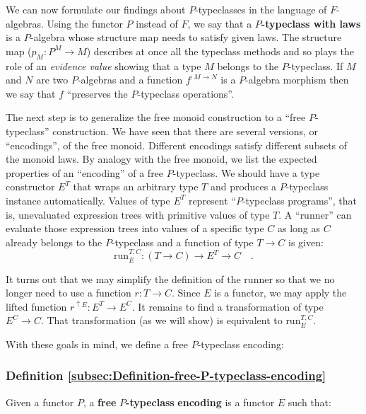 We can now formulate our findings about $P$-typeclasses in the language
of $F$-algebras. Using the functor $P$ instead of $F$, we say that
a $P$\textbf{-typeclass with laws} is
a $P$-algebra whose structure map needs to satisfy given laws. The
structure map ($p_{M}:P^{M}\rightarrow M$) describes at once all
the typeclass methods and so plays the role of an \emph{evidence value}
showing that a type $M$ belongs to the $P$-typeclass. If $M$ and
$N$ are two $P$-algebras and a function $f^{:M\rightarrow N}$ is
a $P$-algebra morphism then we say that $f$ \textsf{``}preserves the $P$-typeclass
operations\textsf{''}. 

The next step is to generalize the free monoid construction to a \textsf{``}free
$P$-typeclass\textsf{''} construction. We have seen that there are several
versions, or \textsf{``}encodings\textsf{''}, of the free monoid. Different encodings
satisfy different subsets of the monoid laws. By analogy with the
free monoid, we list the expected properties of an \textsf{``}encoding\textsf{''}
of a free $P$-typeclass. We should have a type constructor $E^{T}$
that wraps an arbitrary type $T$ and produces a $P$-typeclass instance
automatically. Values of type $E^{T}$ represent \textsf{``}$P$-typeclass
programs\textsf{''}, that is, unevaluated expression trees with primitive
values of type $T$. A \textsf{``}runner\textsf{''} can evaluate those expression
trees into values of a specific type $C$ as long as $C$ already
belongs to the $P$-typeclass and a function of type $T\rightarrow C$
is given:
\[
\text{run}_{E}^{T,C}:(T\rightarrow C)\rightarrow E^{T}\rightarrow C\quad.
\]

It turns out that we may simplify the definition of the runner so
that we no longer need to use a function $r:T\rightarrow C$. Since
$E$ is a functor, we may apply the lifted function $r^{\uparrow E}:E^{T}\rightarrow E^{C}$.
It remains to find a transformation of type $E^{C}\rightarrow C$.
That transformation (as we will show) is equivalent to $\text{run}_{E}^{T,C}$.

With these goals in mind, we define a free $P$-typeclass encoding:

\subsubsection{Definition \label{subsec:Definition-free-P-typeclass-encoding}\ref{subsec:Definition-free-P-typeclass-encoding}}

Given a functor $P$, a \textbf{free} $P$\textbf{-typeclass} \textbf{encoding}
is a functor $E$ such that:

